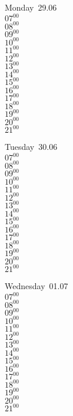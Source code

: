 \documentclass[11pt,a4paper]{book}\usepackage[]{graphicx}\usepackage[]{color}
\begin{document}

\begin{headerbox}
\end{headerbox}
\begin{weekdaybox}
  Monday~29.06\\
  { 
  \vfill
  $07^{00}$\\
$08^{00}$\\
$09^{00}$\\
$10^{00}$\\
$11^{00}$\\
$12^{00}$\\
$13^{00}$\\
$14^{00}$\\
$15^{00}$\\
$16^{00}$\\
$17^{00}$\\
$18^{00}$\\
$19^{00}$\\
$20^{00}$\\
$21^{00}$\\
  }
\end{weekdaybox}
\begin{weekdaybox}
  Tuesday~30.06\\
  { 
  \vfill
  $07^{00}$\\
$08^{00}$\\
$09^{00}$\\
$10^{00}$\\
$11^{00}$\\
$12^{00}$\\
$13^{00}$\\
$14^{00}$\\
$15^{00}$\\
$16^{00}$\\
$17^{00}$\\
$18^{00}$\\
$19^{00}$\\
$20^{00}$\\
$21^{00}$\\
  }
\end{weekdaybox}
\begin{weekdaybox}
  Wednesday~01.07\\
  { 
  \vfill
  $07^{00}$\\
$08^{00}$\\
$09^{00}$\\
$10^{00}$\\
$11^{00}$\\
$12^{00}$\\
$13^{00}$\\
$14^{00}$\\
$15^{00}$\\
$16^{00}$\\
$17^{00}$\\
$18^{00}$\\
$19^{00}$\\
$20^{00}$\\
$21^{00}$\\
  }
\end{weekdaybox}
\end{document}
